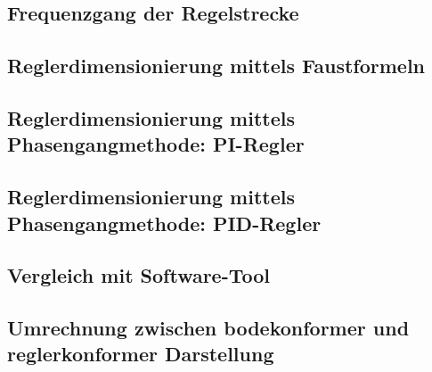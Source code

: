 \clearpage
\subsection{Frequenzgang der Regelstrecke}
\label{subs:frequenzgang}


\subsection{Reglerdimensionierung mittels Faustformeln}
\label{subs:faustformeln}


\subsection{Reglerdimensionierung mittels Phasengangmethode: PI-Regler}
\label{subs:phasengang:pi}


\subsection{Reglerdimensionierung mittels Phasengangmethode: PID-Regler}
\label{subs:phasengang:pid}


\subsection{Vergleich mit Software-Tool}
\label{subs:tool:results}


\subsection{Umrechnung zwischen bodekonformer und reglerkonformer Darstellung}
\label{subs:bode_regler}


